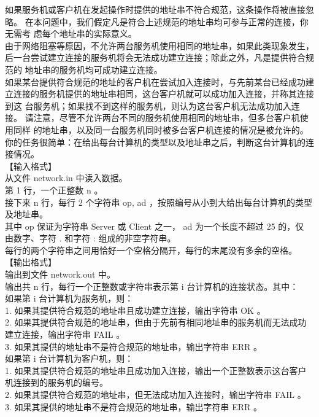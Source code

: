 \documentclass[12pt,twiside,a4paper]{ctexbook}
\numberwithin{chapter}{part}
\begin{document}
如果服务机或客户机在发起操作时提供的地址串不符合规范，这条操作将被直接忽
略。
在本问题中，我们假定凡是符合上述规范的地址串均可参与正常的连接，你无需考
虑每个地址串的实际意义。\\
由于网络阻塞等原因，不允许两台服务机使用相同的地址串，如果此类现象发生，
后一台尝试建立连接的服务机将会无法成功建立连接；除此之外，凡是提供符合规范的
地址串的服务机均可成功建立连接。\\
如果某台提供符合规范的地址的客户机在尝试加入连接时，与先前某台已经成功建
立连接的服务机提供的地址串相同，这台客户机就可以成功加入连接，并称其连接到这
台服务机；如果找不到这样的服务机，则认为这台客户机无法成功加入连接。
请注意，尽管不允许两台不同的服务机使用相同的地址串，但多台客户机使用同样
的地址串，以及同一台服务机同时被多台客户机连接的情况是被允许的。
你的任务很简单：在给出每台计算机的类型以及地址串之后，判断这台计算机的连
接情况。\\
【输入格式】\\
从文件 network.in 中读入数据。\\
第 1 行，一个正整数 n 。\\
接下来 n 行，每行 2 个字符串 op, ad ，按照编号从小到大给出每台计算机的类型
及地址串。\\
其中 op 保证为字符串 Server 或 Client 之一， ad 为一个长度不超过 25 的，仅
由数字、字符 . 和字符 : 组成的非空字符串。\\
每行的两个字符串之间用恰好一个空格分隔开，每行的末尾没有多余的空格。\\
【输出格式】\\
输出到文件 network.out 中。\\
输出共 n 行，每行一个正整数或字符串表示第 i 台计算机的连接状态。其中：\\
如果第 i 台计算机为服务机，则：\\
1. 如果其提供符合规范的地址串且成功建立连接，输出字符串 OK 。\\
2. 如果其提供符合规范的地址串，但由于先前有相同地址串的服务机而无法成功
建立连接，输出字符串 FAIL 。\\
3. 如果其提供的地址串不是符合规范的地址串，输出字符串 ERR 。\\
如果第 i 台计算机为客户机，则：\\
1. 如果其提供符合规范的地址串且成功加入连接，输出一个正整数表示这台客户
机连接到的服务机的编号。\\
2. 如果其提供符合规范的地址串，但无法成功加入连接时，输出字符串 FAIL 。\\
3. 如果其提供的地址串不是符合规范的地址串，输出字符串 ERR 。\\
\end{document}
